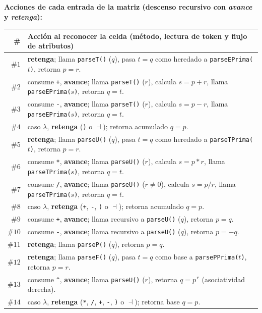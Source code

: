 \documentclass[10pt,a4paper]{article}
\begin{document}
\noindent\textbf{Acciones de cada entrada de la matriz (descenso recursivo con \emph{avance} y \emph{retenga}):}
\begin{table}[H]
\centering
\scriptsize
\begin{tabular}{rl}
\toprule
\textbf{\#} & \textbf{Acción al reconocer la celda (método, lectura de token y flujo de atributos)} \\
\midrule
$\#1$  & \textbf{retenga}; llama \texttt{parseT()} ($q$), pasa $t=q$ como heredado a \texttt{parseEPrima($t$)}, retorna $p=r$. \\
$\#2$  & consume \texttt{+}, \textbf{avance}; llama \texttt{parseT()} ($r$), calcula $s=p+r$, llama \texttt{parseEPrima($s$)}, retorna $q=t$. \\
$\#3$  & consume \texttt{-}, \textbf{avance}; llama \texttt{parseT()} ($r$), calcula $s=p-r$, llama \texttt{parseEPrima($s$)}, retorna $q=t$. \\
$\#4$  & caso $\lambda$, \textbf{retenga} (\texttt{)} o $\dashv$); retorna acumulado $q=p$. \\
$\#5$  & \textbf{retenga}; llama \texttt{parseU()} ($q$), pasa $t=q$ como heredado a \texttt{parseTPrima($t$)}, retorna $p=r$. \\
$\#6$  & consume \texttt{*}, \textbf{avance}; llama \texttt{parseU()} ($r$), calcula $s=p*r$, llama \texttt{parseTPrima($s$)}, retorna $q=t$. \\
$\#7$  & consume \texttt{/}, \textbf{avance}; llama \texttt{parseU()} ($r\neq 0$), calcula $s=p/r$, llama \texttt{parseTPrima($s$)}, retorna $q=t$. \\
$\#8$  & caso $\lambda$, \textbf{retenga} (\texttt{+}, \texttt{-}, \texttt{)} o $\dashv$); retorna acumulado $q=p$. \\
$\#9$  & consume \texttt{+}, \textbf{avance}; llama recursivo a \texttt{parseU()} ($q$), retorna $p=q$. \\
$\#10$ & consume \texttt{-}, \textbf{avance}; llama recursivo a \texttt{parseU()} ($q$), retorna $p=-q$. \\
$\#11$ & \textbf{retenga}; llama \texttt{parseP()} ($q$), retorna $p=q$. \\
$\#12$ & \textbf{retenga}; llama \texttt{parseF()} ($q$), pasa $t=q$ como base a \texttt{parsePPrima($t$)}, retorna $p=r$. \\
$\#13$ & consume \texttt{\^{}}, \textbf{avance}; llama \texttt{parseU()} ($r$), retorna $q=p^{\,r}$ (asociatividad derecha). \\
$\#14$ & caso $\lambda$, \textbf{retenga} (\texttt{*}, \texttt{/}, \texttt{+}, \texttt{-}, \texttt{)} o $\dashv$); retorna base $q=p$. \\

\end{tabular}
\end{table}
\end{document}

